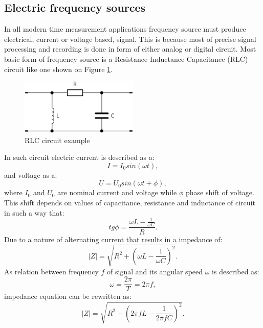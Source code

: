 \subsection{Electric frequency sources}
\label{sec:electronic_frequency}
In all modern time measurement applications frequency source must produce electrical, current or
voltage based, signal. This is because most of precise signal processing and recording is done
in form of either analog or digital circuit.
Most basic form of frequency source is a Resistance Inductance Capacitance (RLC) circuit like 
one shown on Figure \ref{fig:rlc_circ}.
\begin{figure}[htb] 
	\label{fig:rlc_circ}
	\centering
	\includegraphics[width=0.5\textwidth]{figures/rlc}
	\caption{RLC circuit example}
\end{figure}
In such circuit electric current is described as a:
\begin{equation}
	\label{equ:rlc_current}
	I = I_{0}sin(\omega t),
\end{equation}
and voltage as a:
\begin{equation}
	\label{equ:rlc_voltage}
	U = U_{0}sin(\omega t + \phi),
\end{equation}
where $I_{0}$ and $U_{0}$ are nominal current and voltage while $\phi$ phase shift of voltage.
This shift depends on values of capacitance, resistance and inductance of circuit in such a way
that:
\begin{equation}
	\label{equ:rlc_freq}
	tg\phi = \frac{\omega L - \frac{1}{\omega C} }{R}.
\end{equation}
Due to a nature of alternating current that results in a impedance of:
\begin{equation}
	\label{equ:rlc_impedance}
	|Z| = \sqrt{R^{2}+ (\omega L - \frac{1}{\omega C})^{2} }.
\end{equation}
As relation between frequency $f$ of signal and its angular speed $\omega$ is described as:
\begin{equation}
	\label{equ:pulse_to_freq}
	\omega = \frac{2\pi}{T} = 2\pi f,
\end{equation}
impedance equation can be rewritten as:
\begin{equation}
	\label{equ:rlc_impedance}
	|Z| = \sqrt{R^{2}+ (2\pi fL - \frac{1}{2\pi f C})^{2} }.
\end{equation}
